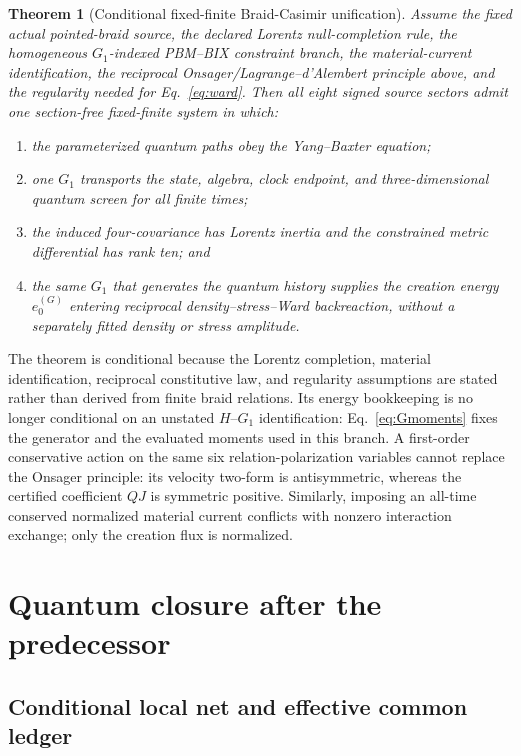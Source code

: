 \documentclass[11pt]{article}
\newtheorem{theorem}{Theorem}[section]
\theoremstyle{definition}
\theoremstyle{remark}
\begin{document}
\begin{theorem}[Conditional fixed-finite Braid-Casimir unification]\label{thm:v4}
Assume the fixed actual pointed-braid source, the declared Lorentz null-completion rule, the homogeneous $G_1$-indexed PBM--BIX constraint branch, the material-current identification, the reciprocal Onsager/Lagrange--d'Alembert principle above, and the regularity needed for Eq.~\eqref{eq:ward}. Then all eight signed source sectors admit one section-free fixed-finite system in which:
\begin{enumerate}[label=(\roman*)]
 \item the parameterized quantum paths obey the Yang--Baxter equation;
 \item one $G_1$ transports the state, algebra, clock endpoint, and three-dimensional quantum screen for all finite times;
 \item the induced four-covariance has Lorentz inertia and the constrained metric differential has rank ten; and
 \item the same $G_1$ that generates the quantum history supplies the creation energy $e_0^{(G)}$ entering reciprocal density--stress--Ward backreaction, without a separately fitted density or stress amplitude.
\end{enumerate}
\end{theorem}

The theorem is conditional because the Lorentz completion, material identification, reciprocal constitutive law, and regularity assumptions are stated rather than derived from finite braid relations. Its energy bookkeeping is no longer conditional on an unstated $H$--$G_1$ identification: Eq.~\eqref{eq:Gmoments} fixes the generator and the evaluated moments used in this branch. A first-order conservative action on the same six relation-polarization variables cannot replace the Onsager principle: its velocity two-form is antisymmetric, whereas the certified coefficient $QJ$ is symmetric positive. Similarly, imposing an all-time conserved normalized material current conflicts with nonzero interaction exchange; only the creation flux is normalized.

\section{Quantum closure after the predecessor}

\subsection{Conditional local net and effective common ledger}
\end{document}
